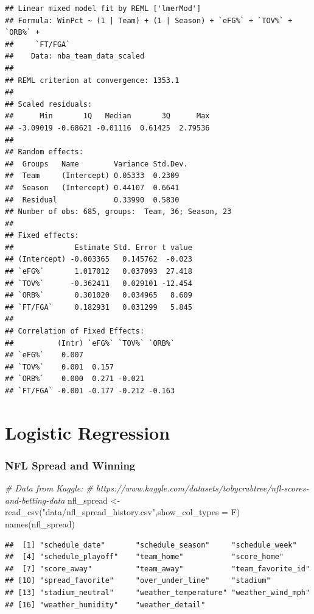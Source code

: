 \documentclass[
  11pt,
]{book}
\newenvironment{Shaded}{\begin{snugshade}}{\end{snugshade}}
\newcommand{\AttributeTok}[1]{\textcolor[rgb]{0.77,0.63,0.00}{#1}}
\newcommand{\CommentTok}[1]{\textcolor[rgb]{0.56,0.35,0.01}{\textit{#1}}}
\newcommand{\FunctionTok}[1]{\textcolor[rgb]{0.00,0.00,0.00}{#1}}
\newcommand{\NormalTok}[1]{#1}
\newcommand{\OtherTok}[1]{\textcolor[rgb]{0.56,0.35,0.01}{#1}}
\newcommand{\StringTok}[1]{\textcolor[rgb]{0.31,0.60,0.02}{#1}}
\theoremstyle{definition}
\theoremstyle{definition}
\theoremstyle{definition}
\theoremstyle{definition}
\theoremstyle{remark}
\begin{document}
\begin{verbatim}
## Linear mixed model fit by REML ['lmerMod']
## Formula: WinPct ~ (1 | Team) + (1 | Season) + `eFG%` + `TOV%` + `ORB%` +  
##     `FT/FGA`
##    Data: nba_team_data_scaled
## 
## REML criterion at convergence: 1353.1
## 
## Scaled residuals: 
##      Min       1Q   Median       3Q      Max 
## -3.09019 -0.68621 -0.01116  0.61425  2.79536 
## 
## Random effects:
##  Groups   Name        Variance Std.Dev.
##  Team     (Intercept) 0.05333  0.2309  
##  Season   (Intercept) 0.44107  0.6641  
##  Residual             0.33990  0.5830  
## Number of obs: 685, groups:  Team, 36; Season, 23
## 
## Fixed effects:
##              Estimate Std. Error t value
## (Intercept) -0.003365   0.145762  -0.023
## `eFG%`       1.017012   0.037093  27.418
## `TOV%`      -0.362411   0.029101 -12.454
## `ORB%`       0.301020   0.034965   8.609
## `FT/FGA`     0.182931   0.031299   5.845
## 
## Correlation of Fixed Effects:
##          (Intr) `eFG%` `TOV%` `ORB%`
## `eFG%`    0.007                     
## `TOV%`    0.001  0.157              
## `ORB%`    0.000  0.271 -0.021       
## `FT/FGA` -0.001 -0.177 -0.212 -0.163
\end{verbatim}

\hypertarget{logistic-regression}{%
\chapter{Logistic Regression}\label{logistic-regression}}

\hypertarget{nfl-spread-and-winning}{%
\subsection{NFL Spread and Winning}\label{nfl-spread-and-winning}}

\begin{Shaded}
\begin{Highlighting}[]
\CommentTok{\# Data from Kaggle:}
\CommentTok{\# https://www.kaggle.com/datasets/tobycrabtree/nfl{-}scores{-}and{-}betting{-}data}
\NormalTok{nfl\_spread }\OtherTok{\textless{}{-}} \FunctionTok{read\_csv}\NormalTok{(}\StringTok{"data/nfl\_spread\_history.csv"}\NormalTok{,}\AttributeTok{show\_col\_types =}\NormalTok{ F)}
\FunctionTok{names}\NormalTok{(nfl\_spread)}
\end{Highlighting}
\end{Shaded}

\begin{verbatim}
##  [1] "schedule_date"       "schedule_season"     "schedule_week"      
##  [4] "schedule_playoff"    "team_home"           "score_home"         
##  [7] "score_away"          "team_away"           "team_favorite_id"   
## [10] "spread_favorite"     "over_under_line"     "stadium"            
## [13] "stadium_neutral"     "weather_temperature" "weather_wind_mph"   
## [16] "weather_humidity"    "weather_detail"
\end{verbatim}
\end{document}

